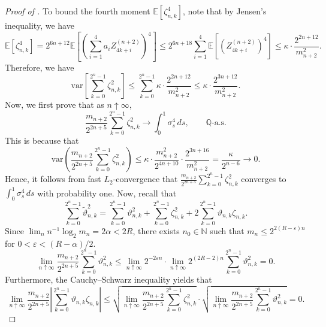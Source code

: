 \documentclass[12pt,reqno]{article}
\def\ua{\uparrow}
\def\wt{\widetilde}
\numberwithin{equation}{section}
\def\var{\mbox{var}}
\theoremstyle{definition}
\def\wt#1{\widetilde{#1}}
\def\ua{\uparrow}
\def\wt{\widetilde}
\newcommand{\bE}{\mathbb{E}}
\newcommand{\bN}{\mathbb{N}}
\newcommand{\bQ}{\mathbb{Q}}
\begin{document}
\begin{proof}[Proof of ]
	To bound the fourth moment $\bE\left[\zeta^4_{n,k}\right]$, note that by Jensen's inequality, we have 
	\begin{equation*}
		\bE\left[\zeta_{n,k}^4\right] = 2^{6n+12}\bE\left[\left(\sum_{i = 1}^{4}a_iZ^{(n+2)}_{4k+i}\right)^4\right] \le 2^{6n+18} \sum_{i = 1}^{4}\bE\left[\left(Z^{(n+2)}_{4k+i}\right)^4\right] \le \kappa \cdot \frac{2^{2n+12}}{m^2_{n+2}}.
	\end{equation*}
		Therefore, we have 
	\begin{equation*}
		\var\left[\sum_{k = 0}^{2^n-1}\zeta_{n,k}^2\right] \le \sum_{k = 0}^{2^n-1}\kappa \cdot \frac{2^{2n+12}}{m^2_{n+2}} \le \kappa \cdot \frac{2^{3n+12}}{m^2_{n+2}}.
	\end{equation*}
	Now, we first prove that as $n \ua \infty$,
	\begin{equation*}
		\frac{m_{n+2}}{2^{2n+5}}\sum_{k = 0}^{2^n-1}\zeta_{n,k}^2 \longrightarrow \int_0^1 \sigma_s^4\,ds, \qquad \bQ\text{-a.s.}
	\end{equation*}
	This is because that 
	\begin{equation*}
		\var\left(\frac{m_{n+2}}{2^{2n+5}}\sum_{k = 0}^{2^n-1}\zeta_{n,k}^2\right) \le \kappa \cdot \frac{m^2_{n+2}}{2^{4n+10}} \cdot \frac{2^{3n+16}}{m^2_{n+2}} = \frac{\kappa}{2^{n-6}} \longrightarrow 0.
	\end{equation*}
	Hence, it follows from  fast $L_2$-convergence that $\frac{m_{n+2}}{2^{2n+5}}\sum_{k = 0}^{2^n-1}\zeta_{n,k}^2$ converges to $\int_0^1\sigma_s^4\, ds$ with probability one. Now, recall that 
	\begin{equation*}
		\sum_{k = 0}^{2^n-1}\wt \vartheta^2_{n,k} = \sum_{k = 0}^{2^n-1}\vartheta^2_{n,k} + \sum_{k = 0}^{2^n-1}\zeta^2_{n,k} + 2\sum_{k = 0}^{2^n-1}\vartheta_{n,k}\zeta_{n,k}.
	\end{equation*} 
	Since $\lim_n n^{-1}\log_2 m_n = 2\alpha < 2R$, there exists $n_0 \in \bN$ such that $m_n \le 2^{2(R-\varepsilon)n}$ for $0 < \varepsilon < (R - \alpha)/2$. 
	\begin{equation*}
		\lim_{n \ua \infty}\frac{m_{n+2}}{2^{2n+5}}\sum_{k = 0}^{2^n-1}\vartheta^2_{n,k} \le \lim_{n \ua \infty} 2^{-2\varepsilon n} \cdot \lim_{n \ua \infty} 2^{(2R-2)n} \sum_{k = 0}^{2^n-1}\vartheta^2_{n,k} = 0.
	\end{equation*}
	Furthermore, the Cauchy--Schwarz inequality yields that 
	\begin{equation*}
		\lim_{n \ua \infty}\frac{m_{n+2}}{2^{2n+5}}\left|\sum_{k = 0}^{2^n-1}\vartheta_{n,k}\zeta_{n,k}\right| \le \sqrt{\lim_{n \ua \infty}\frac{m_{n+2}}{2^{2n+5}}\sum_{k = 0}^{2^n-1}\zeta^2_{n,k}}\cdot\sqrt{\lim_{n \ua \infty}\frac{m_{n+2}}{2^{2n+5}}\sum_{k = 0}^{2^n-1}\vartheta^2_{n,k}}  = 0.

\end{equation*}
\end{proof}
\end{document}
